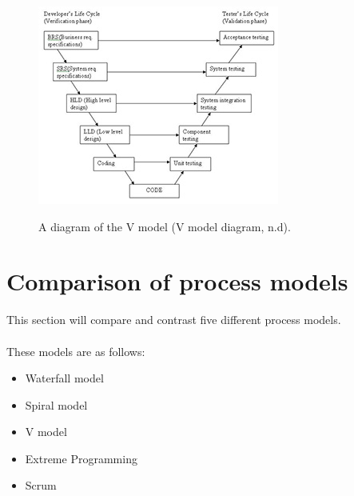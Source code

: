 \documentclass{CRPITStyle}
\begin{document}
		\begin{figure}
		\includegraphics{VModel1}
		~\\
		\caption{\protect\label{VModel} A diagram of the V model (V model diagram, n.d).}
		\end{figure}
		
	\section {Comparison of process models}
	
		This section will compare and contrast five different process models.\\
		~\\
		These models are as follows:
		~\\
		\begin{itemize}
			\item Waterfall model
			\item Spiral model
			\item V model
			\item Extreme Programming
			\item Scrum
		\end{itemize}~\\
		
\end{document}
